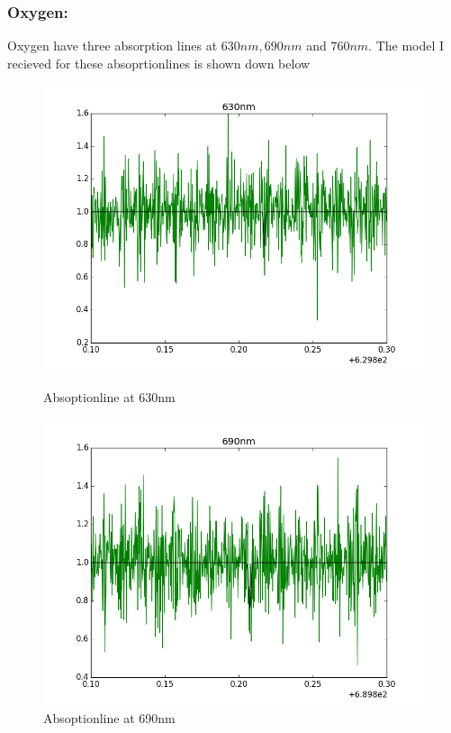\documentclass[a4paper,11pt,english]{report}
\begin{document}
\subsubsection{Oxygen:} Oxygen have three absorption lines at \(630nm,690nm\)
and \(760nm\). The model I recieved for these absoprtionlines is shown down below
\begin{figure}[!htb]
  \includegraphics[scale =0.33]{630nm.png}
  \caption{Absoptionline at 630nm}
  \endminipage\hfill
  \includegraphics[scale = 0.33]{690nm.png}
  \caption{Absoptionline at 690nm}
  \endminipage\hfill

\end{figure}
\end{document}
